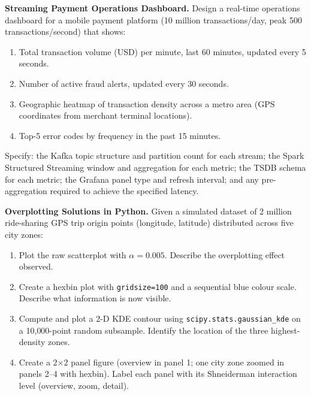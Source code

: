 \dpr \textbf{Streaming Payment Operations Dashboard.}
Design a real-time operations dashboard for a mobile payment platform
(10 million transactions/day, peak 500 transactions/second) that shows:
\begin{enumerate}[label=(\alph*)]
  \item Total transaction volume (USD) per minute, last 60 minutes,
        updated every 5 seconds.
  \item Number of active fraud alerts, updated every 30 seconds.
  \item Geographic heatmap of transaction density across a metro area
        (GPS coordinates from merchant terminal locations).
  \item Top-5 error codes by frequency in the past 15 minutes.
\end{enumerate}
Specify: the Kafka topic structure and partition count for each stream;
the Spark Structured Streaming window and aggregation for each metric;
the TSDB schema for each metric; the Grafana panel type and refresh interval;
and any pre-aggregation required to achieve the specified latency.


\pe \textbf{Overplotting Solutions in Python.}
Given a simulated dataset of 2 million ride-sharing GPS trip origin points
(longitude, latitude) distributed across five city zones:
\begin{enumerate}[label=(\alph*)]
  \item Plot the raw scatterplot with $\alpha = 0.005$. Describe the
        overplotting effect observed.
  \item Create a hexbin plot with \texttt{gridsize=100} and a sequential
        blue colour scale. Describe what information is now visible.
  \item Compute and plot a 2-D KDE contour using \texttt{scipy.stats.gaussian\_kde}
        on a 10{,}000-point random subsample. Identify the location of the
        three highest-density zones.
  \item Create a 2$\times$2 panel figure (overview in panel 1; one city zone
        zoomed in panels 2--4 with hexbin). Label each panel with its
        Shneiderman interaction level (overview, zoom, detail).
\end{enumerate}

